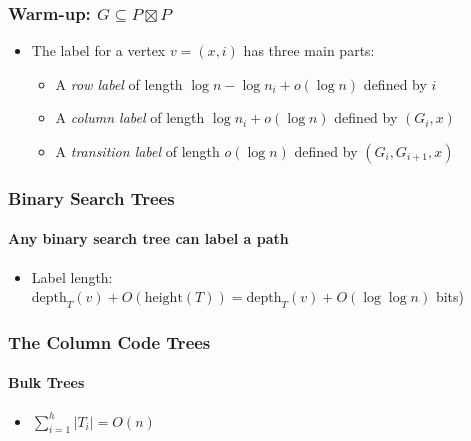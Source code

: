 \documentclass[aspectratio=169,xcolor=dvipsnames]{beamer}
\begin{document}
\begin{frame}
    \frametitle{Warm-up: $G\subseteq P\boxtimes P$}

    \begin{center}
    \end{center}
    \begin{itemize}
        \item The label for a vertex $v=(x,i)$ has three main parts:
        \begin{itemize}
            \item A \emph{row label} of length $\log n -\log n_i + o(\log n)$ defined by $i$
            \item A \emph{column label} of length $\log n_i +o(\log n)$ defined by $(G_i,x)$
            \item A \emph{transition label} of length $o(\log n)$ defined by $(G_i,G_{i+1},x)$
        \end{itemize}
    \end{itemize}
\end{frame}

\begin{frame}
    \frametitle{Binary Search Trees}
    \framesubtitle{Any binary search tree can label a path}

    \begin{center}
    \end{center}
    \begin{itemize}
        \item Label length: $\mathrm{depth}_T(v)+ O(\mathrm{height}(T))=\mathrm{depth}_T(v)+O(\log\log n)$ bits)
    \end{itemize}
\end{frame}

\begin{frame}
    \frametitle{The Column Code Trees}
    \framesubtitle{Bulk Trees}

    \begin{center}
    \end{center}
    \begin{itemize}
        \item<4>$\sum_{i=1}^h |T_i| = O(n)$
    \end{itemize}
\end{frame}
\end{document}
